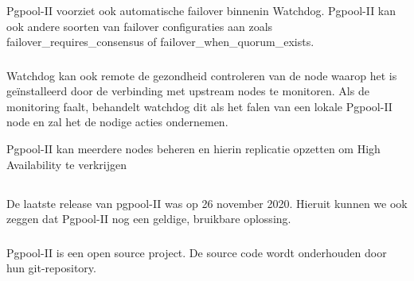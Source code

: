\subsubsection{}
\label{subsubsec:Failover}

Pgpool-II voorziet ook automatische failover binnenin Watchdog. Pgpool-II kan ook andere soorten van failover configuraties aan zoals failover\_requires\_consensus of failover\_when\_quorum\_exists. 

\subsubsection{}
\label{subsubsec:Monitoring}

Watchdog kan ook remote de gezondheid controleren van de node waarop het is geïnstalleerd door de verbinding met upstream nodes te monitoren. Als de monitoring faalt, behandelt watchdog dit als het falen van een lokale Pgpool-II node en zal het de nodige acties ondernemen.

Pgpool-II kan meerdere nodes beheren en hierin replicatie opzetten om High Availability te verkrijgen

\subsection{}
\label{subsec:Should have}


\subsubsection{}
\label{subsubsec:Actieve ondersteuning in 2020-2021}

De laatste release van pgpool-II was op 26 november 2020. Hieruit kunnen we ook zeggen dat Pgpool-II nog een geldige, bruikbare oplossing.

\subsubsection{}
\label{subsubsec:Open source}

Pgpool-II is een open source project. De source code wordt onderhouden door hun git-repository.

